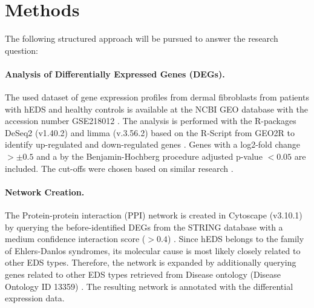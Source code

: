 \section{Methods}
The following structured approach will be pursued to answer the research question:

\paragraph{Analysis of Differentially Expressed Genes (DEGs).}\label{sec:methods-deg}
The used dataset of gene expression profiles from dermal fibroblasts from patients with hEDS and healthy controls is available at the NCBI GEO database with the accession number GSE218012 \cite{Ritelli2020}. The analysis is performed with the R-packages DeSeq2 (v1.40.2) and limma (v.3.56.2) based on the R-Script from GEO2R to identify up-regulated and down-regulated genes \cite{DESeq2, limma}. Genes with a log2-fold change $> \pm 0.5$ and a by the Benjamin-Hochberg procedure adjusted p-value $< 0.05$ are included. The cut-offs were chosen based on similar research \cite{Karimizadeh2019, Lim2019}.

\paragraph{Network Creation.}
The Protein-protein interaction (PPI) network is created in Cytoscape (v3.10.1) \cite{Cytoscape} by querying the before-identified DEGs from the STRING database with a medium confidence interaction score ($> 0.4$) \cite{StringDB}. Since hEDS belongs to the family of Ehlers-Danlos syndromes, its molecular cause is most likely closely related to other EDS types. Therefore, the network is expanded by additionally querying genes related to other EDS types retrieved from Disease ontology (Disease Ontology ID 13359) \cite{DO}. The resulting network is annotated with the differential expression data.
	
